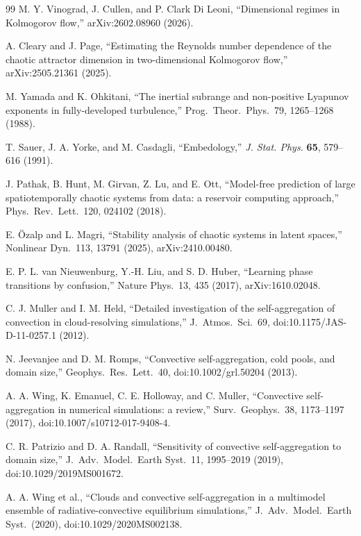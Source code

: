 \documentclass[11pt]{article}
\begin{document}
\begin{thebibliography}{99}
 M. Y. Vinograd, J. Cullen, and P. Clark
Di Leoni, ``Dimensional regimes in Kolmogorov flow,'' arXiv:2602.08960
(2026).

 A. Cleary and J. Page, ``Estimating the
Reynolds number dependence of the chaotic attractor dimension in
two-dimensional Kolmogorov flow,'' arXiv:2505.21361 (2025).

 M. Yamada and K. Ohkitani, ``The inertial
subrange and non-positive Lyapunov exponents in fully-developed
turbulence,'' Prog.\ Theor.\ Phys.\ 79, 1265--1268 (1988).

 T. Sauer, J. A. Yorke, and M. Casdagli, ``Embedology,'' \emph{J. Stat. Phys.} \textbf{65}, 579--616 (1991).

 J. Pathak, B. Hunt, M. Girvan, Z. Lu, and E. Ott,
``Model-free prediction of large spatiotemporally chaotic systems from
data: a reservoir computing approach,'' Phys.\ Rev.\ Lett.\ 120, 024102
(2018).

 E. \"Ozalp and L. Magri, ``Stability analysis
of chaotic systems in latent spaces,'' Nonlinear Dyn.\ 113, 13791 (2025),
arXiv:2410.00480.

 E. P. L. van Nieuwenburg, Y.-H. Liu, and
S. D. Huber, ``Learning phase transitions by confusion,'' Nature Phys.\
13, 435 (2017), arXiv:1610.02048.

 C. J. Muller and I. M. Held, ``Detailed
investigation of the self-aggregation of convection in cloud-resolving
simulations,'' J.\ Atmos.\ Sci.\ 69, doi:10.1175/JAS-D-11-0257.1 (2012).

 N. Jeevanjee and D. M. Romps, ``Convective
self-aggregation, cold pools, and domain size,'' Geophys.\ Res.\ Lett.\
40, doi:10.1002/grl.50204 (2013).

 A. A. Wing, K. Emanuel, C. E. Holloway, and C.
Muller, ``Convective self-aggregation in numerical simulations: a
review,'' Surv.\ Geophys.\ 38, 1173--1197 (2017),
doi:10.1007/s10712-017-9408-4.

 C. R. Patrizio and D. A. Randall,
``Sensitivity of convective self-aggregation to domain size,'' J.\ Adv.\
Model.\ Earth Syst.\ 11, 1995--2019 (2019), doi:10.1029/2019MS001672.

\bibitem{wing2020rcemip} A. A. Wing et al., ``Clouds and convective
self-aggregation in a multimodel ensemble of radiative-convective
equilibrium simulations,'' J.\ Adv.\ Model.\ Earth Syst.\ (2020),
doi:10.1029/2020MS002138.


\end{thebibliography}
\end{document}
